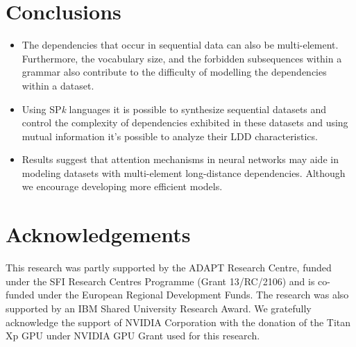 \documentclass[a0,portrait]{a0poster}
\begin{document}
\begin{multicols}{2}

\section*{Conclusions}

\begin{itemize}
\item The dependencies that occur in sequential data can also be multi-element. Furthermore, the vocabulary size, and the forbidden subsequences within a grammar also contribute to the difficulty of modelling the dependencies within a dataset.
\item Using SP\emph{k} languages it is possible to synthesize sequential datasets and control the complexity of dependencies exhibited in these datasets and using mutual information it's possible to analyze their LDD characteristics.
\item Results suggest that attention mechanisms in neural networks may aide in modeling datasets with multi-element long-distance dependencies. Although we encourage developing more efficient models.
\end{itemize}




\section*{Acknowledgements}

This research was partly supported by the ADAPT Research Centre, funded under the SFI Research Centres Programme (Grant 13/RC/2106) and is co-funded under the European Regional Development Funds. The research was also supported by an IBM Shared University Research Award. We gratefully acknowledge the support of NVIDIA Corporation with the donation of the Titan Xp GPU under NVIDIA GPU Grant used for this research.


\end{multicols}
\end{document}
